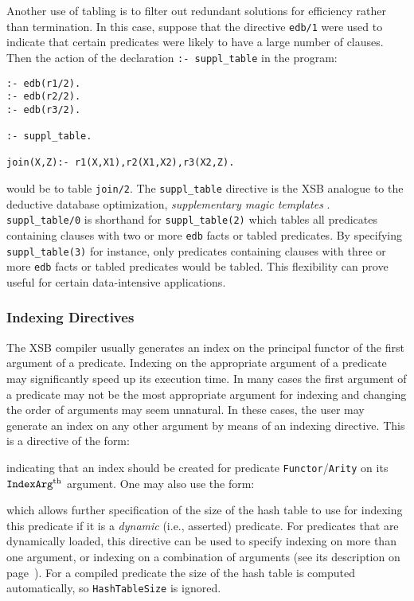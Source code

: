 Another use of tabling is to filter out redundant solutions for
efficiency rather than termination.  In this case, suppose that the
directive {\tt edb/1} were used to indicate that certain predicates were
likely to have a large number of clauses.  Then the action of the declaration
{\tt :- suppl\_table} in the program:
\begin{verbatim}
:- edb(r1/2).
:- edb(r2/2).
:- edb(r3/2).

:- suppl_table.

join(X,Z):- r1(X,X1),r2(X1,X2),r3(X2,Z).
\end{verbatim}
would be to table {\tt join/2}.  The {\tt suppl\_table} directive is
the XSB analogue to the deductive database optimization, {\em
supplementary magic templates} \cite{BeRa91}.  {\tt suppl\_table/0} is
shorthand for {\tt suppl\_table(2)} which tables all predicates
containing clauses with two or more {\tt edb} facts or tabled
predicates.  By specifying {\tt suppl\_table(3)} for instance, only
predicates containing clauses with three or more {\tt edb} facts or
tabled predicates would be tabled.  This flexibility can prove useful
for certain data-intensive applications.


\subsubsection{Indexing Directives}\label{indexing_directives}

The XSB compiler usually generates an index on the principal 
functor of the first argument of a predicate.  Indexing on the appropriate 
argument of a predicate may significantly speed up its execution time.  
In many cases the first argument of a predicate may not be the most
appropriate argument for indexing and changing the order of arguments
may seem unnatural.  In these cases, the user may generate an index
on any other argument by means of an indexing directive.  This is a
directive of the form:


\noindent
indicating that an index should be created for predicate 
{\tt Functor}/{\tt Arity} on its ${\tt IndexArg}^{\rm th}$ argument.
One may also use the form:


\noindent
which allows further specification of the size of the hash table to use for
indexing this predicate if it is a {\em dynamic} (i.e., asserted) predicate.
For predicates that are dynamically loaded, this directive can be used to
specify indexing on more than one argument, or indexing on a combination
of arguments (see its description on page~\pageref{index_dynamic}).
For a compiled predicate the size of the hash table is computed automatically,
so {\tt HashTableSize} is ignored.

